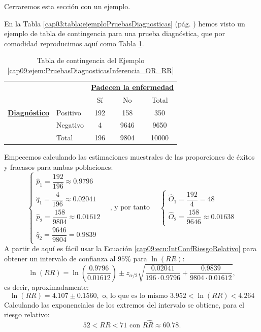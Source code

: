 Cerraremos esta sección con un ejemplo.
\begin{ejemplo}
\label{cap09:ejem:PruebasDiagnosticasInferencia_OR_RR}
En la Tabla \ref{cap03:tabla:ejemploPruebasDiagnosticas} (pág. \pageref{cap03:tabla:ejemploPruebasDiagnosticas}) hemos visto un ejemplo de tabla de contingencia para una prueba diagnóstica, que por comodidad reproducimos aquí como Tabla \ref{cap09:tabla:ejemploPruebasDiagnosticas}.

\begin{table}[h!]
        \begin{center}
            \begin{tabular}{llccc}
            &&\multicolumn{3}{c}{\underline{\bf Padecen la enfermedad}}\\

                                      &          & Sí &  No & Total\\
            \hline
          \underline{\bf Diagnóstico} & Positivo & 192&  158&   350\\
                                      & Negativo &  4 & 9646&  9650\\
            \cline{2-5}
                                      & Total    & 196& 9804& 10000\\
            \hline
            \end{tabular}
        \end{center}
        \caption{Tabla de contingencia del Ejemplo \ref{cap09:ejem:PruebasDiagnosticasInferencia_OR_RR}}
        \label{cap09:tabla:ejemploPruebasDiagnosticas}
\end{table}
Empecemos calculando las estimaciones muestrales de las proporciones de éxitos y fracasos para ambas poblaciones:
\[
\begin{cases}
    \hat p_1=\dfrac{192}{196}\approx 0.9796\\[3mm]
    \hat q_1=\dfrac{4}{196}\approx 0.02041\\[3mm]
    \hat p_2=\dfrac{158}{9804}\approx 0.01612\\[3mm]
    \hat q_2=\dfrac{9646}{9804}=0.9839
\end{cases}
\quad
\mbox{, y por tanto }
\quad
\begin{cases}
    \hat O_1=\dfrac{192}{4}=48\\[3mm]
    \hat O_2=\dfrac{158}{9646}\approx 0.01638
\end{cases}
\]
A partir de aquí es fácil usar la Ecuación \ref{cap09:ecu:IntConfRiesgoRelativo} para obtener un intervalo de confianza al $95\%$ para $\ln(RR)$:
\[
\ln(RR)=\ln\left(\dfrac{0.9796}{0.01612}\right)\pm z_{\alpha/2}\sqrt{\dfrac{0.02041}{196\cdot 0.9796}+\dfrac{0.9839}{9804\cdot 0.01612}},
\]
es decir, aproximadamente:
\[
\ln(RR)=4.107\pm 0.1560,\mbox{ o, lo que es lo mismo } 3.952<\ln(RR)<4.264
\]
Calculando las exponenciales de los extremos del intervalo se obtiene, para el riesgo relativo:
\[52< RR < 71\mbox { con }\widehat{RR}\approx 60.78.\]


\end{ejemplo}
